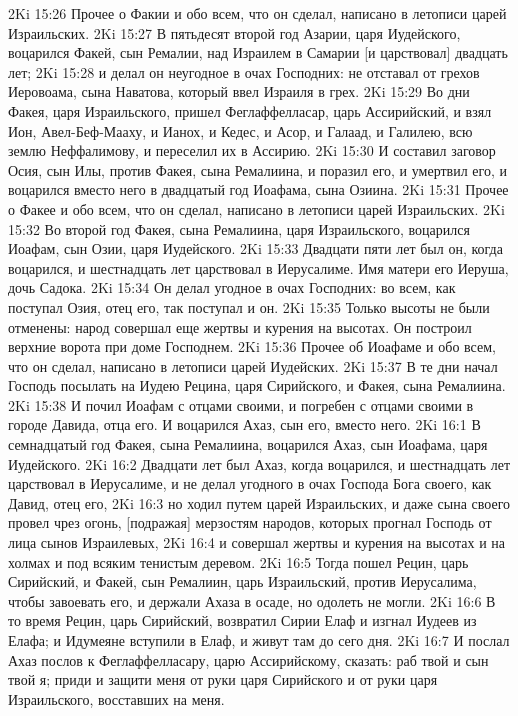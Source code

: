 2Ki 15:26  Прочее о Факии и обо всем, что он сделал, написано в летописи царей Израильских.
2Ki 15:27  В пятьдесят второй год Азарии, царя Иудейского, воцарился Факей, сын Ремалии, над Израилем в Самарии [и царствовал] двадцать лет;
2Ki 15:28  и делал он неугодное в очах Господних: не отставал от грехов Иеровоама, сына Наватова, который ввел Израиля в грех.
2Ki 15:29  Во дни Факея, царя Израильского, пришел Феглаффелласар, царь Ассирийский, и взял Ион, Авел-Беф-Мааху, и Ианох, и Кедес, и Асор, и Галаад, и Галилею, всю землю Неффалимову, и переселил их в Ассирию.
2Ki 15:30  И составил заговор Осия, сын Илы, против Факея, сына Ремалиина, и поразил его, и умертвил его, и воцарился вместо него в двадцатый год Иоафама, сына Озиина.
2Ki 15:31  Прочее о Факее и обо всем, что он сделал, написано в летописи царей Израильских.
2Ki 15:32  Во второй год Факея, сына Ремалиина, царя Израильского, воцарился Иоафам, сын Озии, царя Иудейского.
2Ki 15:33  Двадцати пяти лет был он, когда воцарился, и шестнадцать лет царствовал в Иерусалиме. Имя матери его Иеруша, дочь Садока.
2Ki 15:34  Он делал угодное в очах Господних: во всем, как поступал Озия, отец его, так поступал и он.
2Ki 15:35  Только высоты не были отменены: народ совершал еще жертвы и курения на высотах. Он построил верхние ворота при доме Господнем.
2Ki 15:36  Прочее об Иоафаме и обо всем, что он сделал, написано в летописи царей Иудейских.
2Ki 15:37  В те дни начал Господь посылать на Иудею Рецина, царя Сирийского, и Факея, сына Ремалиина.
2Ki 15:38  И почил Иоафам с отцами своими, и погребен с отцами своими в городе Давида, отца его. И воцарился Ахаз, сын его, вместо него.
2Ki 16:1  В семнадцатый год Факея, сына Ремалиина, воцарился Ахаз, сын Иоафама, царя Иудейского.
2Ki 16:2  Двадцати лет был Ахаз, когда воцарился, и шестнадцать лет царствовал в Иерусалиме, и не делал угодного в очах Господа Бога своего, как Давид, отец его,
2Ki 16:3  но ходил путем царей Израильских, и даже сына своего провел чрез огонь, [подражая] мерзостям народов, которых прогнал Господь от лица сынов Израилевых,
2Ki 16:4  и совершал жертвы и курения на высотах и на холмах и под всяким тенистым деревом.
2Ki 16:5  Тогда пошел Рецин, царь Сирийский, и Факей, сын Ремалиин, царь Израильский, против Иерусалима, чтобы завоевать его, и держали Ахаза в осаде, но одолеть не могли.
2Ki 16:6  В то время Рецин, царь Сирийский, возвратил Сирии Елаф и изгнал Иудеев из Елафа; и Идумеяне вступили в Елаф, и живут там до сего дня.
2Ki 16:7  И послал Ахаз послов к Феглаффелласару, царю Ассирийскому, сказать: раб твой и сын твой я; приди и защити меня от руки царя Сирийского и от руки царя Израильского, восставших на меня.
